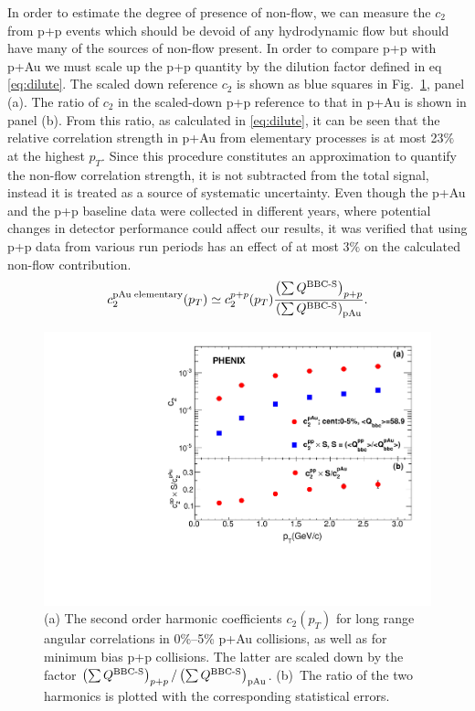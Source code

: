 In order to estimate the degree of presence of non-flow, we can measure the $c_2$ from p+p events which should be devoid of any hydrodynamic flow but should have many of the sources of non-flow present. In order to compare p+p with p+Au we must scale up the p+p quantity by the dilution factor defined in eq \ref{eq:dilute}.
The scaled down reference $c_{2}$ is shown as blue squares in Fig.~\ref{fig:non_flow}, panel (a). The ratio of $c_2$ in the scaled-down p+p reference to that in p+Au is shown in panel (b). From this ratio, as calculated in \ref{eq:dilute}, it can be seen that the relative correlation strength in p+Au from elementary processes is at most 23$\%$ at the highest $p_T$. Since this procedure constitutes an approximation to quantify the non-flow correlation strength, it is not subtracted from the total signal, instead it is treated as a source of systematic uncertainty. Even though the p+Au and the p+p baseline data were collected in different years, where potential changes in detector performance could affect our results, it was verified that using p+p data from various run periods has an effect of at most 3$\%$ on the calculated non-flow contribution.
\begin{equation}
c_{2}^{{\rm pAu \; elementary}}(p_{T}) \simeq c_{2}^{p+p}(p_{T})
\frac{\left( \sum Q^{{\rm \text{BBC-S}}} \right)_{p+p}}
{\left( \sum Q^{{\rm \text{BBC-S}}} \right)_{{\rm pAu}}
}.
\label{eq:dilute}
\end{equation}

\begin{figure}[!h]
\begin{center}
\includegraphics[width=0.6\linewidth]{figs/non_flow.pdf}
\caption{(a) The second order harmonic coefficients $c_2(p_T)$ for long range angular correlations in
0\%--5\% p+Au collisions, as well as for minimum bias p+p collisions. The latter are scaled down by the factor $\left( \sum Q^{{\rm \text{BBC-S}}} \right)_{p+p} / \left( \sum Q^{{\rm
\text{BBC-S}}} \right)_{{\rm pAu}}$. (b)~The
ratio of the two harmonics is plotted with the corresponding statistical errors.}
\label{fig:non_flow}
\end{center}
\end{figure}



